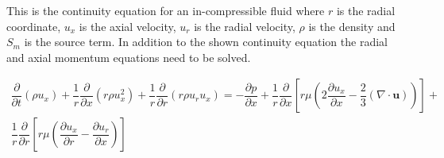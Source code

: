 \documentclass[../thesis.tex]{subfiles}
\begin{document}
This is the continuity equation for an in-compressible fluid where $r$ is the radial coordinate, $u_x$ is the axial velocity, $u_r$ is the radial velocity, $\rho$ is the density and $S_m$ is the source term. In addition to the shown continuity equation the radial and axial momentum equations need to be solved.


\begin{gather}
	\dfrac{\partial}{\partial t}(\rho u_x) + \dfrac{1}{r} \dfrac{\partial}{\partial x}(r \rho u_x^2)
	+ \dfrac{1}{r} \dfrac{\partial}{\partial r}(r \rho u_r u_x) = 
	- \dfrac{\partial p}{\partial x} + \dfrac{1}{r} \dfrac{\partial }{\partial x} \left[ 
	r \mu \left( 2 \dfrac{\partial u_x}{\partial x} - \dfrac{2}{3}(\nabla \cdot \mathbf{u}) \right)
	\right] + \\ \nonumber
	\dfrac{1}{r} \dfrac{\partial }{\partial r} \left[ 
	r \mu \left( \dfrac{\partial u_x}{\partial r} - \dfrac{\partial u_r}{\partial x} \right)
	\right]	
\end{gather}

\end{document}
